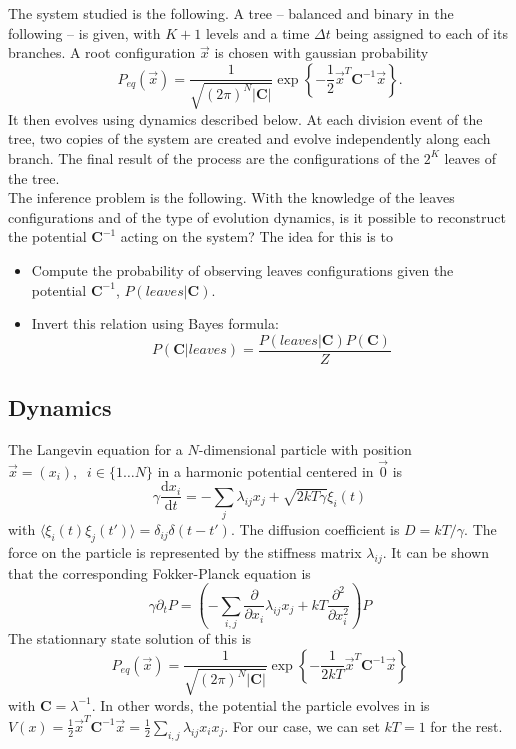 \documentclass[10pt]{article}
\newcommand{\ddroit}{\textrm{d}}
\begin{document}
The system studied is the following. A tree -- balanced and binary in the following -- is given, with $K+1$ levels  and a time $\Delta t$ being assigned to each of its branches. A root configuration $\vec{x}$ is chosen with gaussian probability 
$$ P_{eq}(\vec{x}) = \frac{1}{\sqrt{(2\pi)^N \vert \bm{C}\vert}}\exp\left\{ -\frac{1}{2}\vec{x}^T\bm{C}^{-1}\vec{x} \right\}. $$ 
It then evolves using dynamics described below. At each division event of the tree, two copies of the system are created and evolve independently along each branch. The final result of the process are the configurations of the $2^K$ leaves of the tree. \\
The inference problem is the following. With the knowledge of the leaves configurations and of the type of evolution dynamics, is it possible to reconstruct the potential $\bm{C}^{-1}$ acting on the system? The idea for this is to
\begin{itemize}
  \item Compute the probability of observing leaves configurations given the potential $\bm{C}^{-1}$, $P(leaves\vert\bm{C})$.
  \item Invert this relation using Bayes formula: $$P(\bm{C}\vert leaves) = \frac{P(leaves\vert\bm{C})P(\bm{C})}{Z}$$
 \end{itemize}

\subsection{Dynamics} %
\label{sub:dynamics}


The Langevin equation for a $N$-dimensional particle with position $\vec{x} = (x_i),\;\;i\in\{1\ldots N\}$ in a harmonic potential centered in $\vec{0}$ is 
\begin{equation}
  \gamma \frac{\ddroit x_i}{\ddroit t} = -\sum_{j}\lambda_{ij}x_j + \sqrt{2kT\gamma}\xi_i(t)
\end{equation}
with $\langle \xi_i(t)\xi_j(t') \rangle = \delta_{ij}\delta(t-t')$. The diffusion coefficient is $D = kT/\gamma$. The force on the particle is represented by the stiffness matrix $\lambda_{ij}$. It can be shown that the corresponding Fokker-Planck equation is 
\begin{equation}
\label{eq:multiFP}
  \gamma\partial_t P = \left(-\sum_{i,j}\frac{\partial}{\partial x_i}\lambda_{ij}x_j + kT\frac{\partial^2}{\partial x_i^2}\right)P
\end{equation} 
The stationnary state solution of this is 
\begin{equation}
  P_{eq}(\vec{x}) = \frac{1}{\sqrt{(2\pi)^N \vert \bm{C}\vert}}\exp\left\{ -\frac{1}{2kT}\vec{x}^T\bm{C}^{-1}\vec{x} \right\}
\end{equation}
with $\bm{C}=\lambda^{-1}$. In other words, the potential the particle evolves in is $V(x)=\frac{1}{2}\vec{x}^T\bm{C}^{-1}\vec{x} = \frac{1}{2}\sum_{i,j} \lambda_{ij}x_i x_j$. For our case, we can set $kT=1$ for the rest.\\
\end{document}
